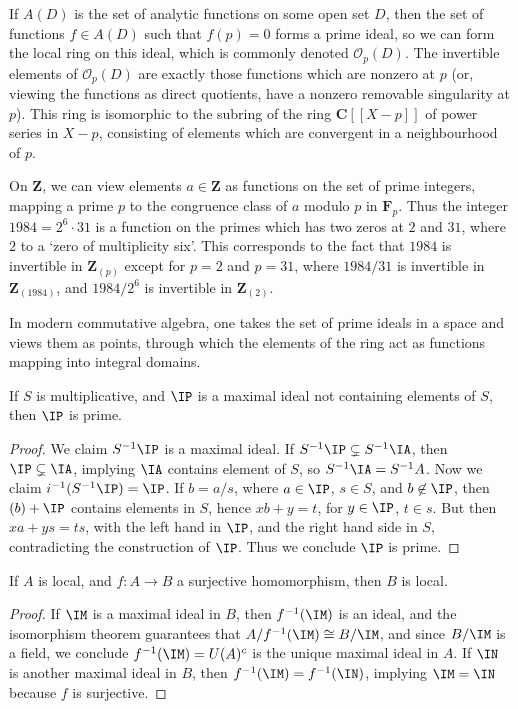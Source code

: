 \begin{example}
    If $A(D)$ is the set of analytic functions on some open set $D$, then the set of functions $f \in A(D)$ such that $f(p) = 0$ forms a prime ideal, so we can form the local ring on this ideal, which is commonly denoted $\mathcal{O}_p(D)$. The invertible elements of $\mathcal{O}_p(D)$ are exactly those functions which are nonzero at $p$ (or, viewing the functions as direct quotients, have a nonzero removable singularity at $p$). This ring is isomorphic to the subring of the ring $\mathbf{C}[[X-p]]$ of power series in $X-p$, consisting of elements which are convergent in a neighbourhood of $p$.
\end{example}

\begin{example}
    On $\mathbf{Z}$, we can view elements $a \in \mathbf{Z}$ as functions on the set of prime integers, mapping a prime $p$ to the congruence class of $a$ modulo $p$ in $\mathbf{F}_p$. Thus the integer $1984 = 2^6 \cdot 31$ is a function on the primes which has two zeros at $2$ and $31$, where $2$ to a `zero of multiplicity six'. This corresponds to the fact that $1984$ is invertible in $\mathbf{Z}_{(p)}$ except for $p = 2$ and $p = 31$, where $1984/31$ is invertible in $\mathbf{Z}_{(1984)}$, and $1984/2^6$ is invertible in $\mathbf{Z}_{(2)}$.
\end{example}

In modern commutative algebra, one takes the set of prime ideals in a space and views them as points, through which the elements of the ring act as functions mapping into integral domains.

\begin{theorem}
    If $S$ is multiplicative, and $\IP$ is a maximal ideal not containing elements of $S$, then $\IP$ is prime.
\end{theorem}
\begin{proof}
    We claim $S^{-1}\IP$ is a maximal ideal. If $S^{-1}\IP \subsetneq S^{-1}\IA$, then $\IP \subsetneq \IA$, implying $\IA$ contains element of $S$, so $S^{-1}\IA = S^{-1}A$. Now we claim $i^{-1}(S^{-1}\IP) = \IP$. If $b = a/s$, where $a \in \IP$, $s \in S$, and $b \not \in \IP$, then $(b) + \IP$ contains elements in $S$, hence $xb + y = t$, for $y \in \IP$, $t \in s$. But then $xa + ys = ts$, with the left hand in $\IP$, and the right hand side in $S$, contradicting the construction of $\IP$. Thus we conclude $\IP$ is prime.
\end{proof}

\begin{prop}
    If $A$ is local, and $f: A \to B$ a surjective homomorphism, then $B$ is local.
\end{prop}
\begin{proof}
    If $\IM$ is a maximal ideal in $B$, then $f^{-1}(\IM)$ is an ideal, and the isomorphism theorem guarantees that $A/f^{-1}(\IM) \cong B/\IM$, and since $B/\IM$ is a field, we conclude $f^{-1}(\IM) = U(A)^c$ is the unique maximal ideal in $A$. If $\IN$ is another maximal ideal in $B$, then $f^{-1}(\IM) = f^{-1}(\IN)$, implying $\IM = \IN$ because $f$ is surjective.
\end{proof}

